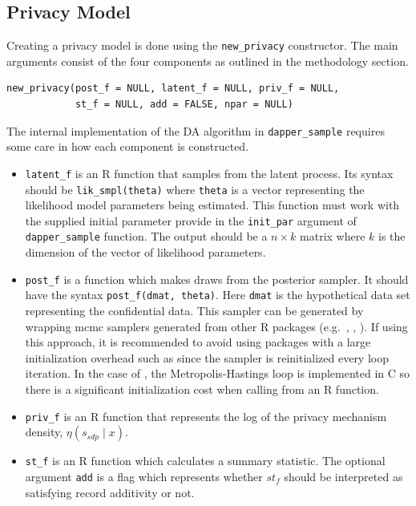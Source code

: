 \hypertarget{privacy-model}{%
\subsection{Privacy Model}\label{privacy-model}}

Creating a privacy model is done using the \texttt{new\_privacy} constructor. The
main arguments consist of the four components as outlined in the methodology
section.

\begin{verbatim}
new_privacy(post_f = NULL, latent_f = NULL, priv_f = NULL,
            st_f = NULL, add = FALSE, npar = NULL)
\end{verbatim}

The internal implementation of the DA algorithm in \texttt{dapper\_sample} requires
some care in how each component is constructed.

\begin{itemize}
\item
  \texttt{latent\_f} is an R function that samples from the latent process. Its
  syntax should be \texttt{lik\_smpl(theta)} where \texttt{theta} is a vector
  representing the likelihood model parameters being estimated. This function
  must work with the supplied initial parameter provide in the \texttt{init\_par}
  argument of \texttt{dapper\_sample} function. The output should be a \(n \times k\) matrix
  where \(k\) is the dimension of the vector of likelihood parameters.
\item
  \texttt{post\_f} is a function which makes draws from the posterior sampler. It should
  have the syntax \texttt{post\_f(dmat,\ theta)}. Here \texttt{dmat} is the
  hypothetical data set representing the confidential data. This sampler can be generated by wrapping mcmc samplers generated from other R packages
  (e.g.~, , ).
  If using this approach, it is recommended to avoid using packages
  with a large initialization overhead such as  since the sampler is reinitialized
  every loop iteration. In the case of ,
  the Metropolis-Hastings loop is implemented in C so there is a significant initialization cost
  when calling from an R function.
\item
  \texttt{priv\_f} is an R function that represents the log of the privacy mechanism density, \(\eta(s_{sdp} \mid x)\).
\item
  \texttt{st\_f} is an R function which calculates a summary statistic. The optional
  argument \texttt{add} is a flag which represents whether \(st_f\) should be interpreted as
  satisfying record additivity or not.
\end{itemize}

